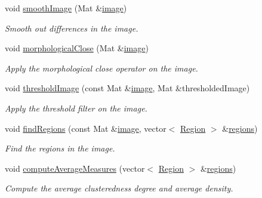 \begin{DoxyCompactItemize}
void \hyperlink{classmultiscale_1_1analysis_1_1RegionDetector_a895f12ad46f2e0d1db45637a5935c2b5}{smooth\-Image} (Mat \&\hyperlink{classmultiscale_1_1analysis_1_1Detector_a523830a6cfe409694ce8327c3c736fbd}{image})
\begin{DoxyCompactList}\small\item\em Smooth out differences in the image. \end{DoxyCompactList}\item 
void \hyperlink{classmultiscale_1_1analysis_1_1RegionDetector_adcb8ab3ced63de9168734f0b24072705}{morphological\-Close} (Mat \&\hyperlink{classmultiscale_1_1analysis_1_1Detector_a523830a6cfe409694ce8327c3c736fbd}{image})
\begin{DoxyCompactList}\small\item\em Apply the morphological close operator on the image. \end{DoxyCompactList}\item 
void \hyperlink{classmultiscale_1_1analysis_1_1RegionDetector_a614cd80fac5d3df2a25c401bb221149c}{threshold\-Image} (const Mat \&\hyperlink{classmultiscale_1_1analysis_1_1Detector_a523830a6cfe409694ce8327c3c736fbd}{image}, Mat \&thresholded\-Image)
\begin{DoxyCompactList}\small\item\em Apply the threshold filter on the image. \end{DoxyCompactList}\item 
void \hyperlink{classmultiscale_1_1analysis_1_1RegionDetector_a886ec5ee1cd2fd816c1cfd4e2ea6778e}{find\-Regions} (const Mat \&\hyperlink{classmultiscale_1_1analysis_1_1Detector_a523830a6cfe409694ce8327c3c736fbd}{image}, vector$<$ \hyperlink{classmultiscale_1_1analysis_1_1Region}{Region} $>$ \&\hyperlink{classmultiscale_1_1analysis_1_1RegionDetector_aa6517ceb3a58295448d32e6e41499893}{regions})
\begin{DoxyCompactList}\small\item\em Find the regions in the image. \end{DoxyCompactList}\item 
void \hyperlink{classmultiscale_1_1analysis_1_1RegionDetector_aee096ec729a12b62fd0c61f74601aad1}{compute\-Average\-Measures} (vector$<$ \hyperlink{classmultiscale_1_1analysis_1_1Region}{Region} $>$ \&\hyperlink{classmultiscale_1_1analysis_1_1RegionDetector_aa6517ceb3a58295448d32e6e41499893}{regions})
\begin{DoxyCompactList}\small\item\em Compute the average clusteredness degree and average density. \end{DoxyCompactList}\item 

\end{DoxyCompactItemize}
